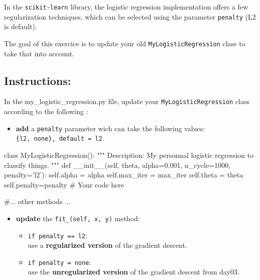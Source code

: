 \documentclass[]{article}
\newenvironment{Shaded}{\begin{snugshade}}{\end{snugshade}}
\newcommand{\CommentTok}[1]{\textcolor[rgb]{0.48,0.49,0.49}{#1}}
\newcommand{\DecValTok}[1]{\textcolor[rgb]{0.96,0.45,0.00}{#1}}
\newcommand{\FloatTok}[1]{\textcolor[rgb]{0.96,0.45,0.00}{#1}}
\newcommand{\FunctionTok}[1]{\textcolor[rgb]{0.56,0.27,0.68}{#1}}
\newcommand{\KeywordTok}[1]{\textcolor[rgb]{0.81,0.81,0.76}{#1}}
\newcommand{\NormalTok}[1]{\textcolor[rgb]{0.81,0.81,0.76}{#1}}
\newcommand{\OperatorTok}[1]{\textcolor[rgb]{0.81,0.81,0.76}{#1}}
\newcommand{\StringTok}[1]{\textcolor[rgb]{0.96,0.31,0.31}{#1}}
\newcommand{\VariableTok}[1]{\textcolor[rgb]{0.15,0.68,0.68}{#1}}
\providecommand{\tightlist}{%
  \setlength{\itemsep}{0pt}\setlength{\parskip}{0pt}}
\begin{document}
In the \texttt{scikit-learn} library, the logistic regression
implementation offers a few regularization techniques, which can be
selected using the parameter \texttt{penalty} (L2 is default).

The goal of this exercice is to update your old
\texttt{MyLogisticRegression} class to take that into account.

\hypertarget{instructions-10}{%
\subsection{Instructions:}\label{instructions-10}}

In the my\_logistic\_regression.py file, update your
\texttt{MyLogisticRegression} class according to the following :

\begin{itemize}
\tightlist
\item
  \textbf{add} a \texttt{penalty} parameter wich can take the following
  values:\\
  \texttt{\{\textquotesingle{}l2\textquotesingle{},\ \textquotesingle{}none\textquotesingle{}\},\ default\ =\ \textquotesingle{}l2\textquotesingle{}}.
\end{itemize}

\begin{Shaded}
\begin{Highlighting}[]
\KeywordTok{class}\NormalTok{ MyLogisticRegression():}
    \CommentTok{"""}
\CommentTok{    Description:}
\CommentTok{        My personnal logistic regression to classify things.}
\CommentTok{    """}
    \KeywordTok{def} \FunctionTok{__init__}\NormalTok{(}\VariableTok{self}\NormalTok{, theta, alpha}\OperatorTok{=}\FloatTok{0.001}\NormalTok{, n_cycle}\OperatorTok{=}\DecValTok{1000}\NormalTok{, penalty}\OperatorTok{=}\StringTok{'l2'}\NormalTok{):}
        \VariableTok{self}\NormalTok{.alpha }\OperatorTok{=}\NormalTok{ alpha}
        \VariableTok{self}\NormalTok{.max_iter }\OperatorTok{=}\NormalTok{ max_iter}
        \VariableTok{self}\NormalTok{.theta }\OperatorTok{=}\NormalTok{ theta}
        \VariableTok{self}\NormalTok{.penalty}\OperatorTok{=}\NormalTok{penalty}
        \CommentTok{# Your code here}

    \CommentTok{#... other methods ...}
\end{Highlighting}
\end{Shaded}

\begin{itemize}
\item
  \textbf{update} the \texttt{fit\_(self,\ x,\ y)} method:

  \begin{itemize}
  \item
    \texttt{if\ penalty\ ==\ \textquotesingle{}l2\textquotesingle{}}:\\
    use a \textbf{regularized version} of the gradient descent.
  \item
    \texttt{if\ penalty\ =\ \textquotesingle{}none\textquotesingle{}}:\\
    use the \textbf{unregularized version} of the gradient descent from
    day03.
  \end{itemize}
\end{itemize}
\end{document}
